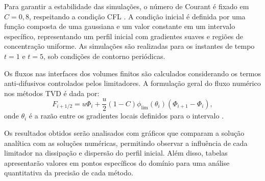 Para garantir a estabilidade das simulações, o número de Courant é fixado em $C = 0,8$, respeitando a condição CFL \cite{leveque2002finite}. A condição inicial é definida por uma função composta de uma gaussiana e um valor constante em um intervalo específico, representando um perfil inicial com gradientes suaves e regiões de concentração uniforme. As simulações são realizadas para os instantes de tempo $t = 1$ e $t = 5$, sob condições de contorno periódicas.

Os fluxos nas interfaces dos volumes finitos são calculados considerando os termos anti-difusivos controlados pelos limitadores. A formulação geral do fluxo numérico nos métodos TVD é dada por:
\[
    F_{i+1/2} = u \Phi_i + \frac{u}{2}(1 - C) \phi_{\text{lim}}(\theta_i)(\Phi_{i+1} - \Phi_i),
\]
onde $\theta_i$ é a razão entre os gradientes locais definidos para o intervalo \cite{leveque2002finite}.

Os resultados obtidos serão analisados com gráficos que comparam a solução analítica com as soluções numéricas, permitindo observar a influência de cada limitador na dissipação e dispersão do perfil inicial. Além disso, tabelas apresentarão valores em pontos específicos do domínio para uma análise quantitativa da precisão de cada método.
